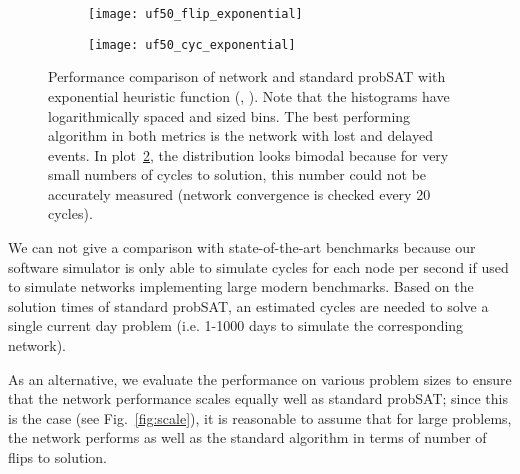 \documentclass[10pt]{article}
\begin{document}
\begin{figure}
 \centering
     \begin{subfigure}[h]{0.4\textwidth}
     \texttt{[image: uf50\_flip\_exponential]} 
     \label{fig:net_noErr_exp_flip}
   \end{subfigure}
   \quad
   \begin{subfigure}[h]{0.4\textwidth}
     \texttt{[image: uf50\_cyc\_exponential]} 
     \label{fig:net_noErr_exp_cyc}
   \end{subfigure}
   \caption{Performance comparison of network and standard probSAT with exponential heuristic function (, ). Note that the histograms have logarithmically spaced and sized bins. The best performing algorithm in both metrics is the network with lost and delayed events. In plot~\ref{fig:net_noErr_exp_cyc}, the distribution looks bimodal because for very small numbers of cycles to solution, this number could not be accurately measured (network convergence is checked every 20 cycles).}
\label{fig:net_noErr}
\end{figure}	

We can not give a comparison with state-of-the-art benchmarks because our software simulator is only able to simulate  cycles for each node per second if used to simulate networks implementing large modern benchmarks. Based on the solution times of standard probSAT, an estimated  cycles are needed to solve a single current day problem (i.e. 1-1000 days to simulate the corresponding network).

As an alternative, we evaluate the performance on various problem sizes to ensure that the network performance scales equally well as standard probSAT; since this is the case (see Fig.~\ref{fig:scale}), it is reasonable to assume that for large problems, the network performs as well as the standard algorithm in terms of number of flips to solution. 
\end{document}
